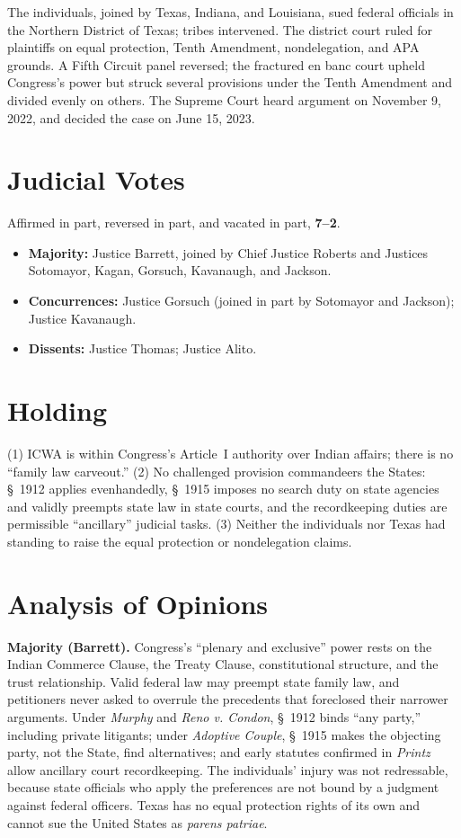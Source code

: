 \documentclass[12pt]{article}
\begin{document}
The individuals, joined by Texas, Indiana, and Louisiana, sued federal officials in the Northern District of Texas; tribes intervened. The district court ruled for plaintiffs on equal protection, Tenth Amendment, nondelegation, and APA grounds. A Fifth Circuit panel reversed; the fractured en banc court upheld Congress's power but struck several provisions under the Tenth Amendment and divided evenly on others. The Supreme Court heard argument on November 9, 2022, and decided the case on June 15, 2023.

\section{Judicial Votes}

Affirmed in part, reversed in part, and vacated in part, \textbf{7--2}.
\begin{itemize}
\item \textbf{Majority:} Justice Barrett, joined by Chief Justice Roberts and Justices Sotomayor, Kagan, Gorsuch, Kavanaugh, and Jackson.
\item \textbf{Concurrences:} Justice Gorsuch (joined in part by Sotomayor and Jackson); Justice Kavanaugh.
\item \textbf{Dissents:} Justice Thomas; Justice Alito.
\end{itemize}

\section{Holding}

(1) ICWA is within Congress's Article~I authority over Indian affairs; there is no ``family law carveout.'' (2) No challenged provision commandeers the States: \S~1912 applies evenhandedly, \S~1915 imposes no search duty on state agencies and validly preempts state law in state courts, and the recordkeeping duties are permissible ``ancillary'' judicial tasks. (3) Neither the individuals nor Texas had standing to raise the equal protection or nondelegation claims.

\section{Analysis of Opinions}

\textbf{Majority (Barrett).} Congress's ``plenary and exclusive'' power rests on the Indian Commerce Clause, the Treaty Clause, constitutional structure, and the trust relationship. Valid federal law may preempt state family law, and petitioners never asked to overrule the precedents that foreclosed their narrower arguments. Under \textit{Murphy} and \textit{Reno v. Condon}, \S~1912 binds ``any party,'' including private litigants; under \textit{Adoptive Couple}, \S~1915 makes the objecting party, not the State, find alternatives; and early statutes confirmed in \textit{Printz} allow ancillary court recordkeeping. The individuals' injury was not redressable, because state officials who apply the preferences are not bound by a judgment against federal officers. Texas has no equal protection rights of its own and cannot sue the United States as \textit{parens patriae}.
\end{document}
